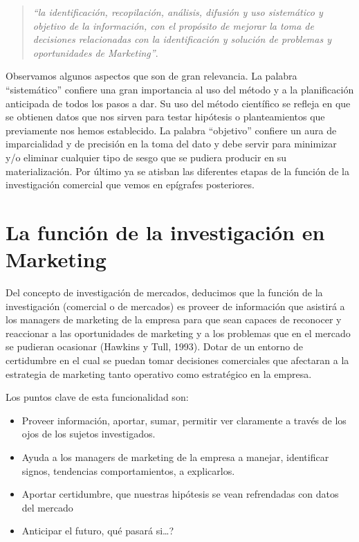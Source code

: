 \documentclass[
]{book}
\providecommand{\tightlist}{%
  \setlength{\itemsep}{0pt}\setlength{\parskip}{0pt}}
\begin{document}
\begin{quote}
\emph{``la identificación, recopilación, análisis, difusión y uso sistemático y objetivo de la información, con el propósito de mejorar la toma de decisiones relacionadas con la identificación y solución de problemas y oportunidades de Marketing''}.
\end{quote}

Observamos algunos aspectos que son de gran relevancia. La palabra ``sistemático'' confiere una gran importancia al uso del método y a la planificación anticipada de todos los pasos a dar. Su uso del método científico se refleja en que se obtienen datos que nos sirven para testar hipótesis o planteamientos que previamente nos hemos establecido. La palabra ``objetivo'' confiere un aura de imparcialidad y de precisión en la toma del dato y debe servir para minimizar y/o eliminar cualquier tipo de sesgo que se pudiera producir en su materialización. Por último ya se atisban las diferentes etapas de la función de la investigación comercial que vemos en epígrafes posteriores.

\hypertarget{la-funciuxf3n-de-la-investigaciuxf3n-en-marketing}{%
\section{La función de la investigación en Marketing}\label{la-funciuxf3n-de-la-investigaciuxf3n-en-marketing}}

Del concepto de investigación de mercados, deducimos que la función de la investigación (comercial o de mercados) es proveer de información que asistirá a los managers de marketing de la empresa para que sean capaces de reconocer y reaccionar a las oportunidades de marketing y a los problemas que en el mercado se pudieran ocasionar (Hawkins y Tull, 1993). Dotar de un entorno de certidumbre en el cual se puedan tomar decisiones comerciales que afectaran a la estrategia de marketing tanto operativo como estratégico en la empresa.

Los puntos clave de esta funcionalidad son:

\begin{itemize}
\tightlist
\item
  Proveer información, aportar, sumar, permitir ver claramente a través de los ojos de los sujetos investigados.
\item
  Ayuda a los managers de marketing de la empresa a manejar, identificar signos, tendencias comportamientos, a explicarlos.
\item
  Aportar certidumbre, que nuestras hipótesis se vean refrendadas con datos del mercado
\item
  Anticipar el futuro, qué pasará si\ldots?
\end{itemize}
\end{document}
